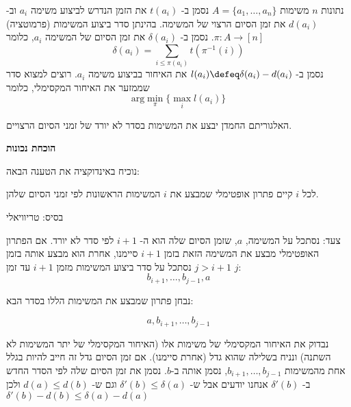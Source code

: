 נתונות $n$ משימות 
$A = \{a_1, \ldots, a_n\}$
נסמן ב-%
$t(a_i)$
את הזמן הנדרש לביצוע משימה 
$a_i$
וב-%
$d(a_i)$
את זמן הסיום הרצוי של המשימה.
בהינתן סדר ביצוע המשימות (פרמוטציה)
$\pi:A \to [n]$.
נסמן ב-%
$\delta(a_i)$
את זמן הסיום של המשימה 
$a_i$,
כלומר
$$\delta(a_i) = \sum_{i \leq \pi(a_i)} t(\pi^{-1}(i))$$
נסמן ב-%
$l(a_i) \defeq \delta(a_i) - d(a_i)$
את האיחור בביצוע משימה 
$a_i$.
רוצים למצוא סדר שממזער את האיחור המקסימלי, כלומר
$$
\text{arg}\min_\pi \{\max_i l(a_i)\}
$$

האלגוריתם החמדן יבצע את המשימות בסדר לא יורד של זמני הסיום הרצויים.

\textbf{הוכחת נכונות}

נוכיח באינדוקציה את הטענה הבאה:

לכל $i$ קיים פתרון אופטימלי שמבצע את $i$ המשימות הראשונות לפי זמני הסיום שלהן.

בסיס: טריוויאלי

צעד: נסתכל על המשימה, $a$, שזמן הסיום שלה הוא ה-%
$i+1$
לפי סדר לא יורד. 
אם הפתרון האופטימלי מבצע את המשימה הזאת בזמן 
$i + 1$
סיימנו, אחרת הוא מבצע אותה בזמן 
$j > i + 1$
נסתכל על סדר ביצוע המשימות מזמן 
$i + 1$
עד זמן 
$j$:
$$
b_{i + 1}, \ldots, b_{j - 1}, a
$$

נבחן פתרון שמבצע את המשימות הללו בסדר הבא:

$$
a, b_{i + 1}, \ldots, b_{j - 1}
$$

נבדוק את האיחור המקסימלי של משימות אלו (האיחור המקסימלי של יתר המשימות לא השתנה) 
ונניח בשלילה שהוא גדל (אחרת סיימנו). 
אם זמן הסיום גדל זה חייב להיות בגלל אחת מהמשימות 
$b_{i+1}, \ldots, b_{j - 1}$,
נסמן אותה ב-$b$. נסמן את זמן הסיום שלה לפי הסדר החדש ב-%
$\delta'(b)$
אנחנו יודעים אבל ש-%
$\delta'(b) \leq \delta(a)$
וגם ש-%
$d(a) \leq d(b)$
ולכן
$\delta'(b) - d(b) \leq \delta(a) - d(a)$


